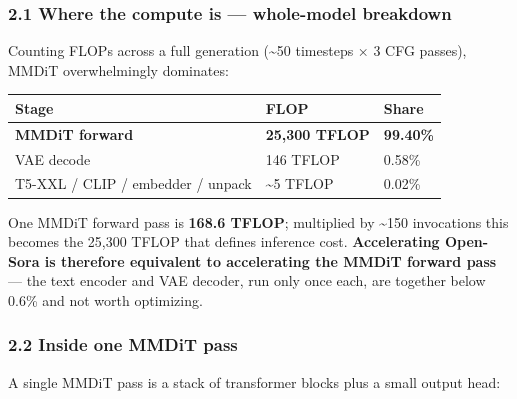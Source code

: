 \documentclass[
  10pt,
]{article}
\newcounter{none} %
\begin{document}
\subsubsection{2.1 Where the compute is --- whole-model
breakdown}\label{whole-model-breakdown}

Counting FLOPs across a full generation (\textasciitilde50 timesteps × 3
CFG passes), MMDiT overwhelmingly dominates:

{\def\LTcaptype{none} %
\begin{longtable}[]{@{}lll@{}}
\toprule\noalign{}
Stage & FLOP & Share \\
\midrule\noalign{}
\endhead
\bottomrule\noalign{}
\endlastfoot
\textbf{MMDiT forward} & \textbf{25,300 TFLOP} & \textbf{99.40\%} \\
VAE decode & 146 TFLOP & 0.58\% \\
T5-XXL / CLIP / embedder / unpack & \textasciitilde5 TFLOP & 0.02\% \\
\end{longtable}
}

One MMDiT forward pass is \textbf{168.6 TFLOP}; multiplied by
\textasciitilde150 invocations this becomes the 25,300 TFLOP that
defines inference cost. \textbf{Accelerating Open-Sora is therefore
equivalent to accelerating the MMDiT forward pass} --- the text encoder
and VAE decoder, run only once each, are together below 0.6\% and not
worth optimizing.

\subsubsection{2.2 Inside one MMDiT pass}\label{inside-one-mmdit-pass}

A single MMDiT pass is a stack of transformer blocks plus a small output
head:
\end{document}
